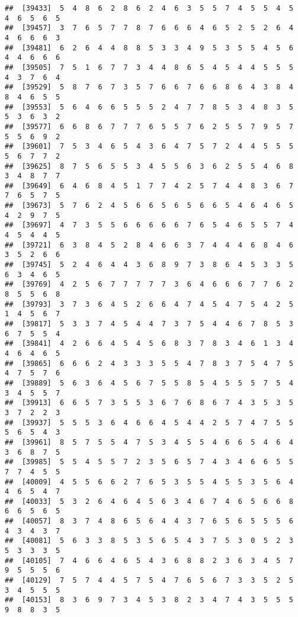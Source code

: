 \documentclass[
]{book}
\begin{document}
\begin{verbatim}
##  [39433]  5  4  8  6  2  8  6  2  4  6  3  5  5  7  4  5  5  4  5  4  6  5  6  5
##  [39457]  3  7  6  5  7  7  8  7  6  6  6  4  6  5  2  5  2  6  4  4  6  6  6  3
##  [39481]  6  2  6  4  4  8  8  5  3  3  4  9  5  3  5  5  4  5  6  4  4  6  6  6
##  [39505]  7  5  1  6  7  7  3  4  4  8  6  5  4  5  4  4  5  5  5  4  3  7  6  4
##  [39529]  5  8  7  6  7  3  5  7  6  6  7  6  6  8  6  4  3  8  4  8  4  6  5  5
##  [39553]  5  6  4  6  6  5  5  5  2  4  7  7  8  5  3  4  8  3  5  5  3  6  3  2
##  [39577]  6  6  8  6  7  7  7  6  5  5  7  6  2  5  5  7  9  5  7  5  5  6  9  2
##  [39601]  7  5  3  4  6  5  4  3  6  4  7  5  7  2  4  4  5  5  5  5  6  7  7  2
##  [39625]  8  7  5  6  5  5  3  4  5  5  6  3  6  2  5  5  4  6  8  3  4  8  7  7
##  [39649]  6  4  6  8  4  5  1  7  7  4  2  5  7  4  4  8  3  6  7  7  6  5  7  5
##  [39673]  5  7  6  2  4  5  6  6  5  6  5  6  6  5  4  6  4  6  5  4  2  9  7  5
##  [39697]  4  7  3  5  5  6  6  6  6  6  7  6  5  4  6  5  5  7  4  4  5  4  4  5
##  [39721]  6  3  8  4  5  2  8  4  6  6  3  7  4  4  4  6  8  4  6  3  5  2  6  6
##  [39745]  5  2  4  6  4  4  3  6  8  9  7  3  8  6  4  5  3  3  5  6  3  4  6  5
##  [39769]  4  2  5  6  7  7  7  7  7  3  6  4  6  6  6  7  7  6  2  8  5  5  6  8
##  [39793]  3  7  3  6  4  5  2  6  6  4  7  4  5  4  7  5  4  2  5  1  4  5  6  7
##  [39817]  5  3  3  7  4  5  4  4  7  3  7  5  4  4  6  7  8  5  3  6  7  5  5  4
##  [39841]  4  2  6  6  4  5  4  5  6  8  3  7  8  3  4  6  1  3  4  4  6  4  6  5
##  [39865]  6  6  6  2  4  3  3  3  5  5  4  7  8  3  7  5  4  7  5  4  7  5  7  6
##  [39889]  5  6  3  6  4  5  6  7  5  5  8  5  4  5  5  5  7  5  4  3  4  5  5  7
##  [39913]  6  6  5  7  3  5  5  3  6  7  6  8  6  7  4  3  5  3  5  3  7  2  2  3
##  [39937]  5  5  5  3  6  4  6  6  4  5  4  4  2  5  7  4  7  5  5  5  6  5  4  3
##  [39961]  8  5  7  5  5  4  7  5  3  4  5  5  4  6  6  5  4  6  4  3  6  8  7  5
##  [39985]  5  5  4  5  5  7  2  3  5  6  5  7  4  3  4  6  6  5  5  7  7  4  5  5
##  [40009]  4  5  5  6  6  2  7  6  5  3  5  5  4  5  5  3  5  6  4  4  6  5  4  7
##  [40033]  5  3  2  6  4  6  4  5  6  3  4  6  7  4  6  5  6  6  8  6  6  5  6  5
##  [40057]  8  3  7  4  8  6  5  6  4  4  3  7  6  5  6  5  5  5  6  4  3  4  3  7
##  [40081]  5  6  3  3  8  5  3  5  6  5  4  3  7  5  3  0  5  2  3  5  3  3  3  5
##  [40105]  7  4  6  6  4  6  5  4  3  6  8  8  2  3  6  3  4  5  7  9  5  5  5  6
##  [40129]  7  5  7  4  4  5  7  5  4  7  6  5  6  7  3  3  5  2  5  3  4  5  5  5
##  [40153]  8  3  6  9  7  3  4  5  3  8  2  3  4  7  4  3  5  5  5  9  8  8  3  5

\end{verbatim}
\end{document}
